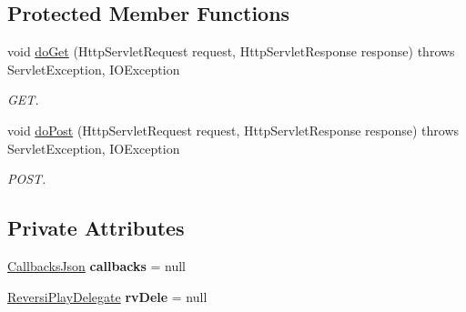 \subsection*{Protected Member Functions}
\begin{DoxyCompactItemize}
\item 
void \hyperlink{classjp_1_1gr_1_1java__conf_1_1yuta__yoshinaga_1_1reversi_1_1controller_1_1_front_controller_a915086fe79bd0246d7b0682691b923d4}{do\+Get} (Http\+Servlet\+Request request, Http\+Servlet\+Response response)  throws Servlet\+Exception, I\+O\+Exception 
\begin{DoxyCompactList}\small\item\em G\+ET. \end{DoxyCompactList}\item 
void \hyperlink{classjp_1_1gr_1_1java__conf_1_1yuta__yoshinaga_1_1reversi_1_1controller_1_1_front_controller_a2f0d63da6e6fc17d2ecf2695af6f8d99}{do\+Post} (Http\+Servlet\+Request request, Http\+Servlet\+Response response)  throws Servlet\+Exception, I\+O\+Exception 
\begin{DoxyCompactList}\small\item\em P\+O\+ST. \end{DoxyCompactList}\end{DoxyCompactItemize}
\subsection*{Private Attributes}
\begin{DoxyCompactItemize}
\item 
\mbox{\label{classjp_1_1gr_1_1java__conf_1_1yuta__yoshinaga_1_1reversi_1_1controller_1_1_front_controller_aba15286819435469622375192358dee7}} 
\hyperlink{classjp_1_1gr_1_1java__conf_1_1yuta__yoshinaga_1_1reversi_1_1model_1_1_callbacks_json}{Callbacks\+Json} {\bfseries callbacks} = null
\item 
\mbox{\label{classjp_1_1gr_1_1java__conf_1_1yuta__yoshinaga_1_1reversi_1_1controller_1_1_front_controller_a582bcd1cbb69aaf686182d85dbd21f2d}} 
\hyperlink{classjp_1_1gr_1_1java__conf_1_1yuta__yoshinaga_1_1reversi_1_1model_1_1_reversi_play_delegate}{Reversi\+Play\+Delegate} {\bfseries rv\+Dele} = null
\end{DoxyCompactItemize}
